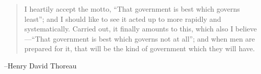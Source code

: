 \documentclass[letterpaper, landscape]{exam}
\begin{document}
  \else
    \vspace{11 cm}
    \begin{quote}
      \begin{em}
        I heartily accept the motto, ``That government is best which governs least''; and I should
        like to see it acted up to more rapidly and systematically. Carried out, it finally amounts
        to this, which also I believe---``That government is best which governs not at all''; and
        when men are prepared for it, that will be the kind of government which they will have.
      \end{em}
    \end{quote}
    \hspace{2 cm} --Henry David Thoreau
  \fi
\end{document}

